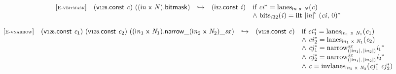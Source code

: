 \vspace{1ex}

$$
\begin{array}{@{}l@{}lcl@{}l@{}}
{[\textsc{\scriptsize E{-}vbitmask}]} \quad & (\mathsf{v{\scriptstyle128}}.\mathsf{const}~{\mathit{c}})~(({\mathsf{i}}{{\mathit{n}}}~\mathsf{x}~{\mathit{N}}).\mathsf{bitmask}) &\hookrightarrow& (\mathsf{i{\scriptstyle32}}.\mathsf{const}~{\mathit{i}}) &\quad
  \mbox{if}~{{\mathit{ci}}^\ast} = {{\mathrm{lanes}}}_{{\mathsf{i}}{{\mathit{n}}}~\mathsf{x}~{\mathit{N}}}({\mathit{c}}) \\
 &&&&\quad {\land}~{{\mathrm{bits}}}_{{{\mathit{i}}}{32}}({\mathit{i}}) = {{\mathrm{ilt}}~{{|{\mathsf{i}}{{\mathit{n}}}|}^{\mathsf{s}}}~({\mathit{ci}},\, 0)^\ast} \\
\end{array}
$$

\vspace{1ex}

$$
\begin{array}{@{}l@{}lcl@{}l@{}}
{[\textsc{\scriptsize E{-}vnarrow}]} \quad & (\mathsf{v{\scriptstyle128}}.\mathsf{const}~{\mathit{c}}_{{1}})~(\mathsf{v{\scriptstyle128}}.\mathsf{const}~{\mathit{c}}_{{2}})~({{{{({{\mathsf{i}}{{\mathit{n}}}}_{{1}}~\mathsf{x}~{\mathit{N}}_{{1}}).\mathsf{narrow}}{\mathsf{\_}}}{({{\mathsf{i}}{{\mathit{n}}}}_{{2}}~\mathsf{x}~{\mathit{N}}_{{2}})}}{\mathsf{\_}}}{{\mathit{sx}}}) &\hookrightarrow& (\mathsf{v{\scriptstyle128}}.\mathsf{const}~{\mathit{c}}) &\quad
  \mbox{if}~{{\mathit{ci}}_{{1}}^\ast} = {{\mathrm{lanes}}}_{{{\mathsf{i}}{{\mathit{n}}}}_{{1}}~\mathsf{x}~{\mathit{N}}_{{1}}}({\mathit{c}}_{{1}}) \\
 &&&&\quad {\land}~{{\mathit{ci}}_{{2}}^\ast} = {{\mathrm{lanes}}}_{{{\mathsf{i}}{{\mathit{n}}}}_{{1}}~\mathsf{x}~{\mathit{N}}_{{1}}}({\mathit{c}}_{{2}}) \\
 &&&&\quad {\land}~{{\mathit{cj}}_{{1}}^\ast} = {{{{{\mathrm{narrow}}}_{({|{{\mathsf{i}}{{\mathit{n}}}}_{{1}}|},\, {|{{\mathsf{i}}{{\mathit{n}}}}_{{2}}|})}^{{\mathit{sx}}}}}{{\mathit{i}}_{{1}}}^\ast} \\
 &&&&\quad {\land}~{{\mathit{cj}}_{{2}}^\ast} = {{{{{\mathrm{narrow}}}_{({|{{\mathsf{i}}{{\mathit{n}}}}_{{1}}|},\, {|{{\mathsf{i}}{{\mathit{n}}}}_{{2}}|})}^{{\mathit{sx}}}}}{{\mathit{i}}_{{2}}}^\ast} \\
 &&&&\quad {\land}~{\mathit{c}} = {{\mathrm{invlanes}}}_{{{\mathsf{i}}{{\mathit{n}}}}_{{2}}~\mathsf{x}~{\mathit{N}}_{{2}}}({{\mathit{cj}}_{{1}}^\ast}~{{\mathit{cj}}_{{2}}^\ast}) \\
\end{array}
$$

